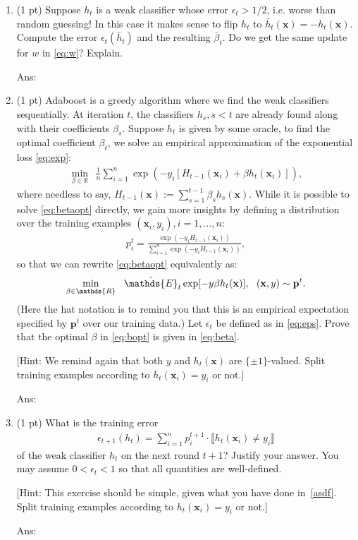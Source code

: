 \documentclass[10pt,letter,notitlepage]{article}
\newcommand{\pred}[1]{\llbracket#1\rrbracket}
\newcommand{\RR}{\mathds{R}}
\newcommand{\xv}{\mathbf{x}}
\newcommand{\EE}{\mathds{E}}
\newcommand{\pv}{\mathbf{p}}
\newcommand{\ans}[1]{{\color{orange}\textsf{Ans}: #1}}
\newcounter{exercise}
\begin{document}
\begin{exercise}
\begin{enumerate}[label=\alph*)]
		[Any function can be approximated arbitrarily well by additive functions but clearly not by linear functions, thus the power of Adaboost.]

\ans{} 
		\item (1 pt) Suppose $h_t$ is a weak classifier whose error $\epsilon_t > 1/2$, i.e. worse than random guessing! In this case it makes sense to flip $h_t$ to $\bar h_t (\xv) = - h_t(\xv)$. Compute the error $\epsilon_t(\bar h_t)$ and the resulting $\bar \beta_t$. Do we get the same update for $w$ in \eqref{eq:w}? Explain.

\ans{} 
		\item (1 pt) Adaboost is a greedy algorithm where we find the weak classifiers sequentially. At iteration $t$, the classifiers $h_{s}, s < t$ are already found along with their coefficients $\beta_s$. Suppose $h_t$ is given by some oracle, to find the optimal coefficient $\beta_t$, we solve an empirical approximation of the exponential loss \eqref{eq:exp}:
      \label{asdf}
		\begin{align}
		\label{eq:betaopt}
		\min_{\beta\in\RR} ~~ \frac{1}{n}\sum_{i=1}^n \exp(- y_i [H_{t-1}(\xv_i) + \beta h_t(\xv_i)]),
		\end{align}
		where needless to say, $H_{t-1}(\xv) := \sum_{s=1}^{t-1} \beta_s h_s(\xv)$.
		While it is possible to solve \eqref{eq:betaopt} directly, we gain more insights by defining a distribution over the training examples $(\xv_i, y_i), i=1, \ldots, n$:
		\begin{align}
		p_i^t = \frac{\exp(- y_i H_{t-1}(\xv_i))}{\sum_{i=1}^n \exp(- y_i H_{t-1}(\xv_i))},
		\end{align}
		so that we can rewrite \eqref{eq:betaopt} equivalently as:
		\begin{align}
		\label{eq:bopt}
		\min_{\beta \in \RR} ~~ \hat\EE_t \exp[- y \beta h_t(\xv)], ~~ (\xv, y) \sim \pv^t.
		\end{align}
		(Here the hat notation is to remind you that this is an empirical expectation specified by $\pv^t$ over our training data.) Let $\epsilon_t$ be defined as in \eqref{eq:eps}. Prove that the optimal $\beta$ in \eqref{eq:bopt} is given in \eqref{eq:beta}.

		[Hint: We remind again that both $y$ and $h_t(\xv)$ are $\{\pm 1\}$-valued. Split training examples according to $h_t(\xv_i) = y_i$ or not.]

\ans{} 
		\item (1 pt) What is the training error
		\begin{align}
		\epsilon_{t+1}(h_t) = \sum_{i=1}^n p^{t+1}_i \cdot \pred{h_t(\xv_i) \ne y_i}
		\end{align}
		of the weak classifier $h_t$ on the next round $t+1$? Justify your answer. You may assume $0 < \epsilon_t < 1$ so that all quantities are well-defined.

      [Hint: This exercise should be simple, given what you have done in~\ref{asdf}. Split training examples according to $h_t(\xv_i) = y_i$ or not.]

  \ans{} 
	\end{enumerate}

\end{exercise}
\end{document}
